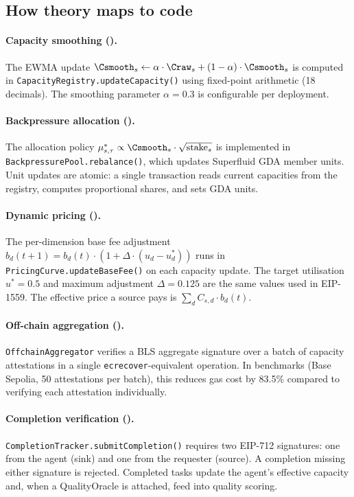 \subsection{How theory maps to code}

\paragraph{Capacity smoothing ().}
The EWMA update $\Csmooth_s \leftarrow \alpha \cdot \Craw_s + (1 - \alpha) \cdot \Csmooth_s$
is computed in \texttt{CapacityRegistry.updateCapacity()} using fixed-point arithmetic
(18 decimals). The smoothing parameter $\alpha = 0.3$ is configurable per deployment.

\paragraph{Backpressure allocation ().}
The allocation policy $\mu^*_{s,\tau} \propto \Csmooth_s \cdot \sqrt{\text{stake}_s}$
is implemented in \texttt{BackpressurePool.rebalance()}, which updates Superfluid GDA
member units. Unit updates are atomic: a single transaction reads current capacities
from the registry, computes proportional shares, and sets GDA units.

\paragraph{Dynamic pricing ().}
The per-dimension base fee adjustment
$b_d(t+1) = b_d(t) \cdot (1 + \Delta \cdot (u_d - u^*_d))$
runs in \texttt{PricingCurve.updateBaseFee()} on each capacity update. The
target utilisation $u^* = 0.5$ and maximum adjustment $\Delta = 0.125$ are
the same values used in EIP-1559. The effective price a source pays is
$\sum_d C_{s,d} \cdot b_d(t)$.

\paragraph{Off-chain aggregation ().}
\texttt{OffchainAggregator} verifies a BLS aggregate signature over a batch of
capacity attestations in a single \texttt{ecrecover}-equivalent operation. In
benchmarks (Base Sepolia, 50 attestations per batch), this reduces gas cost by
83.5\% compared to verifying each attestation individually.

\paragraph{Completion verification ().}
\texttt{CompletionTracker.submitCompletion()} requires two EIP-712 signatures:
one from the agent (sink) and one from the requester (source). A completion
missing either signature is rejected. Completed tasks update the agent's
effective capacity and, when a QualityOracle is attached, feed into quality
scoring.

